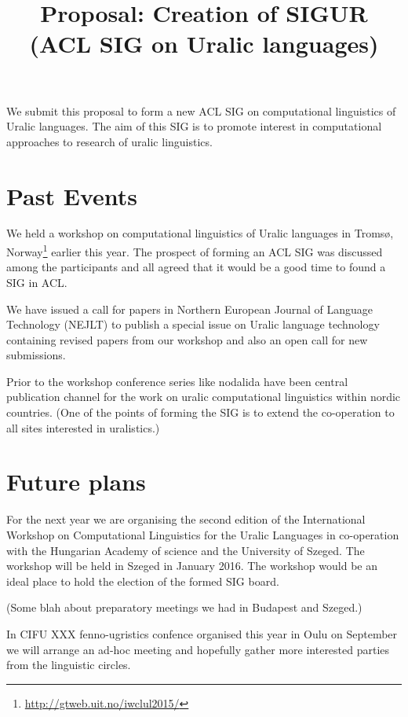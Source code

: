 \documentclass[11pt,a4paper]{article}
\title{Proposal: Creation of SIGUR (ACL SIG on Uralic languages)}
\date{}
\begin{document}
\maketitle

We submit this proposal to form a new ACL SIG on
computational linguistics of Uralic languages. The
aim of this SIG is to promote interest in
computational approaches to research of uralic
linguistics.

\section*{Past Events}

We held a workshop on computational linguistics of
Uralic languages in Tromsø,
Norway\footnote{\url{http://gtweb.uit.no/iwclul2015/}}
earlier this year. The prospect of forming an ACL
SIG was discussed among the participants and all
agreed that it would be a good time to found a SIG
in ACL.

We have issued a call for papers in Northern
European Journal of Language Technology (NEJLT) to
publish a special issue on Uralic language
technology containing revised papers from our
workshop and also an open call for new submissions.

Prior to the workshop conference series like nodalida have been central publication channel for the work on uralic computational linguistics within nordic countries. (One of the points of forming the SIG is to extend the co-operation to all sites interested in uralistics.)

\section*{Future plans}

For the next year we are organising the second edition of the 
International Workshop on Computational Linguistics for the Uralic
Languages  in co-operation with
the Hungarian Academy of science and the University of Szeged. The workshop
will be held in Szeged in January 2016. The workshop would be an ideal place to hold the election of the formed SIG board.

(Some blah about preparatory meetings we had in Budapest and Szeged.)

In CIFU XXX fenno-ugristics confence organised this year in Oulu on September we will arrange an ad-hoc meeting and hopefully gather more interested parties from the linguistic circles.
\end{document}
